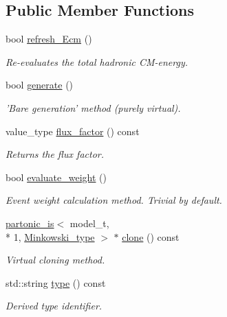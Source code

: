 \subsection*{Public Member Functions}
\begin{DoxyCompactItemize}
\item 
\hypertarget{a00407_a847328f98715570e0947cd62f67e29e1}{bool \hyperlink{a00407_a847328f98715570e0947cd62f67e29e1}{refresh\-\_\-\-Ecm} ()}\label{a00407_a847328f98715570e0947cd62f67e29e1}

\begin{DoxyCompactList}\small\item\em Re-\/evaluates the total hadronic C\-M-\/energy. \end{DoxyCompactList}\item 
bool \hyperlink{a00407_a0dc3e17f5e62711bee89a872b66a6a73}{generate} ()
\begin{DoxyCompactList}\small\item\em 'Bare generation' method (purely virtual). \end{DoxyCompactList}\item 
\hypertarget{a00407_a985936d80fc0f5870b51818bd31584fd}{value\-\_\-type \hyperlink{a00407_a985936d80fc0f5870b51818bd31584fd}{flux\-\_\-factor} () const }\label{a00407_a985936d80fc0f5870b51818bd31584fd}

\begin{DoxyCompactList}\small\item\em Returns the flux factor. \end{DoxyCompactList}\item 
\hypertarget{a00407_ad8ad355c045c1db4994d402bc55a564a}{bool \hyperlink{a00407_ad8ad355c045c1db4994d402bc55a564a}{evaluate\-\_\-weight} ()}\label{a00407_ad8ad355c045c1db4994d402bc55a564a}

\begin{DoxyCompactList}\small\item\em Event weight calculation method. Trivial by default. \end{DoxyCompactList}\item 
\hypertarget{a00407_ab22e62e68f342248e0423f207cae88cf}{\hyperlink{a00406}{partonic\-\_\-is}$<$ model\-\_\-t, \\*
1, \hyperlink{a00369}{Minkowski\-\_\-type} $>$ $\ast$ \hyperlink{a00407_ab22e62e68f342248e0423f207cae88cf}{clone} () const }\label{a00407_ab22e62e68f342248e0423f207cae88cf}

\begin{DoxyCompactList}\small\item\em Virtual cloning method. \end{DoxyCompactList}\item 
\hypertarget{a00407_a798b733cb00a277c7393a0f11e537090}{std\-::string \hyperlink{a00407_a798b733cb00a277c7393a0f11e537090}{type} () const }\label{a00407_a798b733cb00a277c7393a0f11e537090}

\begin{DoxyCompactList}\small\item\em Derived type identifier. \end{DoxyCompactList}\end{DoxyCompactItemize}
